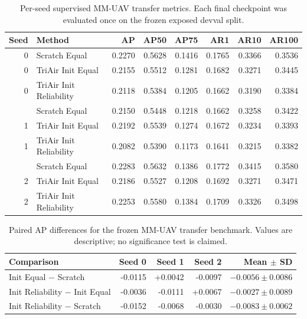 \begin{table}[t]
\centering
\caption{Per-seed supervised MM-UAV transfer metrics. Each final checkpoint was evaluated once on the frozen exposed devval split.}
\label{tab:mmuav-transfer-seeds}
\scriptsize
\setlength{\tabcolsep}{3.4pt}
\begin{tabular}{@{}rlrrrrrr@{}}
\toprule
Seed & Method & AP & AP50 & AP75 & AR1 & AR10 & AR100\\
\midrule
0 & Scratch Equal & 0.2270 & 0.5628 & 0.1416 & 0.1765 & 0.3366 & 0.3536\\
0 & TriAir Init Equal & 0.2155 & 0.5512 & 0.1281 & 0.1682 & 0.3271 & 0.3445\\
0 & TriAir Init Reliability & 0.2118 & 0.5384 & 0.1205 & 0.1662 & 0.3190 & 0.3384\\
\addlinespace
1 & Scratch Equal & 0.2150 & 0.5448 & 0.1218 & 0.1662 & 0.3258 & 0.3422\\
1 & TriAir Init Equal & 0.2192 & 0.5539 & 0.1274 & 0.1672 & 0.3234 & 0.3393\\
1 & TriAir Init Reliability & 0.2082 & 0.5390 & 0.1173 & 0.1641 & 0.3215 & 0.3382\\
\addlinespace
2 & Scratch Equal & 0.2283 & 0.5632 & 0.1386 & 0.1772 & 0.3415 & 0.3580\\
2 & TriAir Init Equal & 0.2186 & 0.5527 & 0.1208 & 0.1692 & 0.3271 & 0.3471\\
2 & TriAir Init Reliability & 0.2253 & 0.5580 & 0.1384 & 0.1709 & 0.3326 & 0.3498\\
\bottomrule
\end{tabular}
\end{table}

\begin{table}[t]
\centering
\caption{Paired AP differences for the frozen MM-UAV transfer benchmark. Values are descriptive; no significance test is claimed.}
\label{tab:mmuav-paired-ap}
\scriptsize
\setlength{\tabcolsep}{3.2pt}
\begin{tabular}{@{}lrrrr@{}}
\toprule
Comparison & Seed 0 & Seed 1 & Seed 2 & Mean $\pm$ SD\\
\midrule
Init Equal $-$ Scratch & -0.0115 & +0.0042 & -0.0097 & $-0.0056\pm0.0086$\\
Init Reliability $-$ Init Equal & -0.0036 & -0.0111 & +0.0067 & $-0.0027\pm0.0089$\\
Init Reliability $-$ Scratch & -0.0152 & -0.0068 & -0.0030 & $-0.0083\pm0.0062$\\
\bottomrule
\end{tabular}
\end{table}

